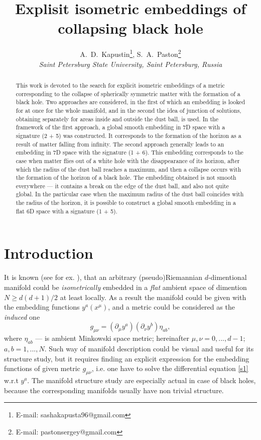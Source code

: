 \documentclass[12pt]{article}
\newcommand{\bq}{\begin{equation}}
\newcommand{\eq}{\end{equation}}
\begin{document}
\title{Explisit isometric embeddings of collapsing black hole}
\author{
A.~D.~Kapustin\thanks{E-mail: sashakapusta96@gmail.com},
S.~A.~Paston\thanks{E-mail: pastonsergey@gmail.com}\\
{\it Saint Petersburg State University, Saint Petersburg, Russia}
}
\date{\vskip 15mm}
\maketitle

\begin{abstract}
This work is devoted to the search for explicit isometric embeddings of a metric corresponding to the collapse of spherically symmetric matter with the formation of a black hole.
Two approaches are considered, in the first of which an embedding is looked for at once for the whole manifold, and in the second the idea of junction of solutions, obtaining separately for areas inside and outside the dust ball, is used.
In the framework of the first approach, a global smooth embedding in 7D space with a signature (2 + 5) was constructed. It corresponds to the formation of the horizon as a result of matter falling from infinity.
The second approach generally leads to an embedding in 7D space with the signature (1 + 6). This embedding
corresponds to the case when matter flies out of a white hole with the disappearance of its horizon,
after which the radius of the dust ball reaches a maximum, and then a collapse occurs with the formation of the horizon of a black hole.
The embedding obtained is not smooth everywhere --- it contains a break on the edge of the dust ball,
and also not quite global.
In the particular case when the maximum radius of the dust ball coincides with the radius of the horizon, it is possible to construct a global smooth embedding in a flat 6D space with a signature (1 + 5).
\end{abstract}

\clearpage

\section{Introduction}
It is known (see for ex. \cite{goenner}), that an arbitrary (pseudo)Riemannian $d$-dimentional manifold could be \emph{isometrically} embedded in a \emph{flat} ambient space of dimention $N \geqslant d(d+1)/2$ at least locally.
As a result the manifold could be given with the embedding functions $y^a(x^\mu)$, and a metric could be considered as the \emph{induced} one
\bq\label{s1}
	g_{\mu \nu} = (\partial_{\mu} y^a) (\partial_{\nu} y^b) \eta_{ab},
\eq
where $\eta_{ab}$ --- is ambient Minkowski space metric; hereinafter $\mu,\nu=0,...,d-1$; $a,b=1,...,N$.
Such way of manifold description could be visual and useful for its structure study, but it requires finding an explicit expression for the embedding functions of given metric $g_{\mu\nu}$, i.e. one have to solve the differential equation \eqref{s1} w.r.t $y^a$. The manifold structure study are especially actual in case of black holes, because the corresponding manifolds usually have non trivial structure.
\end{document}
